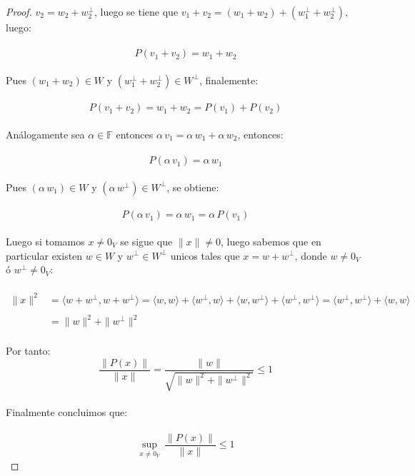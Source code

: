 \documentclass[11pt,letterpaper]{article}
\begin{document}
\begin{proof}
	$v_2=w_2+w_2^{\perp}$, luego se tiene que $v_1+v_2=(w_1+w_2)+(w_1^{\perp}+w_2^{\perp})$, luego:\,\\
	\,\\
	\begin{equation*}
		P(v_1+v_2)=w_1+w_2
	\end{equation*}\,\\
	Pues $(w_1+w_2)\in W$ y $(w_1^{\perp}+w_2^{\perp})\in W^{\perp}$, finalemente:\,\\
	\,\\
	\begin{equation*}
		P(v_1+v_2)=w_1+w_2=P(v_1)+P(v_2)
	\end{equation*}\,\\
	An\'alogamente sea $\alpha \in \mathbb{F}$ entonces $\alpha\,v_1=\alpha\,w_1+\alpha\,w_2$, entonces:\,\\
	\,\\
	\begin{equation*}
		P(\alpha\,v_1)=\alpha\,w_1
	\end{equation*}\,\\
	Pues $(\alpha\,w_1)\in W$ y $(\alpha\,w^{\perp})\in W^{\perp}$, se obtiene:\,\\
	\,\\
	\begin{equation*}
		P(\alpha\,v_1)=\alpha\,w_1=\alpha\,P(v_1)
	\end{equation*}\,\\
	Luego si tomamos $x\neq 0_{V}$ se sigue que $\|x\|\neq 0$, luego sabemos que en particular existen $w\in W$ y $w^{\perp}\in W^{\perp}$ unicos tales
	que $x=w+w^{\perp}$, donde $w\neq 0_V$ \'o $w^{\perp}\neq 0_V$:\,\\
	\,\\
	\begin{align*}
		\|x\|^2&=\langle w+w^{\perp},w+w^\perp\rangle=\langle w,w \rangle+\langle w^{\perp},w \rangle+\langle w,w^{\perp} \rangle+\langle w^{\perp},w^{\perp}\rangle=\langle w^{\perp},w^{\perp}\rangle+\langle w,w\rangle\\
		\,\\
		&=\|w\|^2+\|w^{\perp}\|^2
	\end{align*}\,\\
	Por tanto:\,\\
	\begin{equation*}
		\frac{\|P(x)\|}{\|x\|}=\frac{\|w\|}{\sqrt{\|w\|^2+\|w^{\perp}\|^2}}\leq 1
	\end{equation*}\,\\
	Finalmente concluimos que:\,\\
	\,\\
	\begin{equation*}
		\sup_{x\neq 0_V}\,\frac{\|P(x)\|}{\|x\|}\leq 1
	\end{equation*}
\end{proof}\,\\
\end{document}
